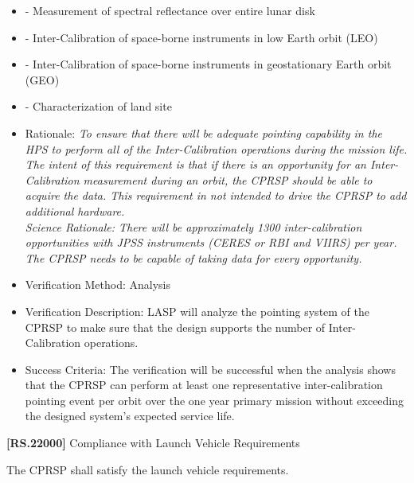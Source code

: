 \documentclass[12pt,oneside,oldfontcommands]{memoir}
\begin{document}
\begin{itemize}
\item{} - Measurement of spectral reflectance over entire lunar disk

\item{} - Inter-Calibration of space-borne instruments in low Earth orbit (LEO)

\item{} - Inter-Calibration of space-borne instruments in geostationary Earth orbit (GEO)

\item{} - Characterization of land site

\item{} Rationale: \emph{To ensure that there will be adequate pointing capability in the HPS to perform all of the Inter-Calibration operations during the mission life. The intent of this requirement is that if there is an opportunity for an Inter-Calibration measurement during an orbit, the CPRSP should be able to acquire the data. This requirement in not intended to drive the CPRSP to add additional hardware.\\
Science Rationale: There will be approximately 1300 inter-calibration opportunities with JPSS instruments (CERES or RBI and VIIRS) per year. The CPRSP needs to be capable of taking data for every opportunity.}

\item{} Verification Method: Analysis

\item{} Verification Description: \gls{LASP} will analyze the \gls{point}ing system of the \gls{CPRSP} to make sure that the design supports the number of Inter-Calibration operations.

\item{} Success Criteria: The verification will be successful when the \gls{analysis} shows that the \gls{CPRSP} can perform at least one representative inter-calibration \gls{point}ing event per orbit over the one year primary mission without exceeding the designed system's expected service life.

\end{itemize}

\textbf{[RS.22000]} Compliance with Launch Vehicle Requirements

The \gls{CPRSP} shall satisfy the launch vehicle requirements.
\end{document}

